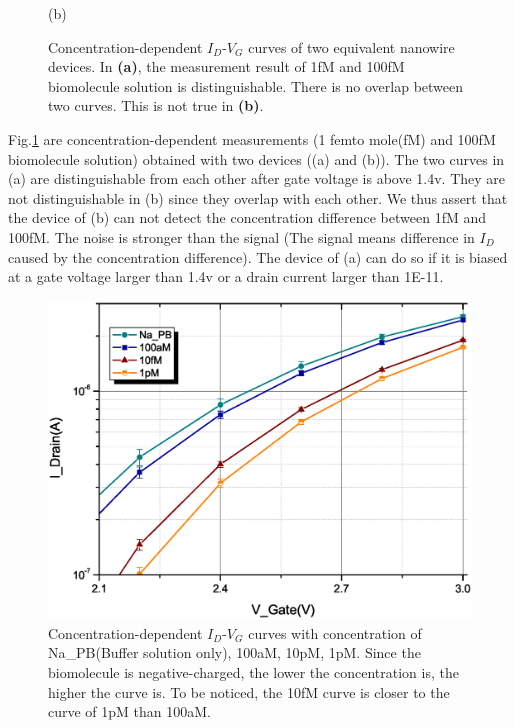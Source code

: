 \begin{figure}[!htb]
\begin{minipage}[t]{1\textwidth}
        (b)
    \end{minipage}
    \caption{Concentration-dependent $I_D$-$V_G$ curves of two equivalent nanowire devices.
    In \textbf{(a)}, the measurement result of 1fM and 100fM biomolecule solution is distinguishable. There is no overlap between two curves. This is not true in \textbf{(b)}.}
    \label{fig:SD_sucandfail}
\end{figure}

Fig.\ref{fig:SD_sucandfail} are concentration-dependent measurements (1 femto mole(fM) and 100fM biomolecule solution) obtained with two devices ((a) and (b)).
The two curves in (a) are distinguishable from each other after gate voltage is above 1.4v.
They are not distinguishable in (b) since they overlap with each other.
We thus assert that the device of (b) can not detect the concentration difference between 1fM and 100fM.
The noise is stronger than the signal (The signal means difference in $I_D$ caused by the concentration difference).
The device of (a) can do so if it is biased at a gate voltage larger than 1.4v or a drain current larger than 1E-11.

\begin{figure}[!htb]
        \includegraphics[width=1\textwidth]{images/chapter3/128_allT_mag.eps}
    \caption{Concentration-dependent $I_D$-$V_G$ curves with concentration of Na\_PB(Buffer solution only), 100aM, 10pM, 1pM.
    Since the biomolecule is negative-charged, the lower the concentration is, the higher the curve is.
    To be noticed, the 10fM curve is closer to the curve of 1pM than 100aM.
     }
    \label{fig:SD_allT}
\end{figure}

